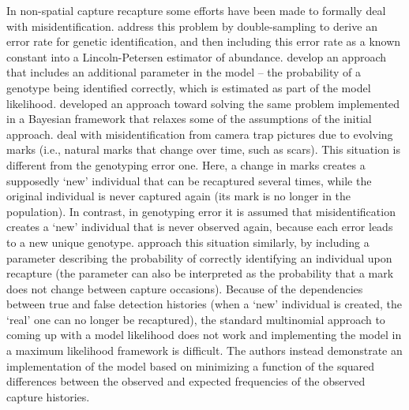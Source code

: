 In non-spatial capture recapture some efforts have been made to
formally deal with misidentification. \citet{stevick_etal:2001}
address this problem by double-sampling to derive an error rate for
genetic identification, and then including this error rate as a known
constant into a Lincoln-Petersen estimator of
abundance. \citet{lukacs_burnham:2005} develop an approach that
includes an additional parameter in the model -- the probability of a
genotype being identified correctly, which is estimated as part of the
model likelihood. \citet{link_etal:2010} developed an approach toward
solving the same problem implemented in a Bayesian framework that
relaxes some of the assumptions of the initial approach.
\citet{yoshizaki_etal:2009} deal with misidentification from camera
trap pictures due to evolving marks (i.e., natural marks that change
over time, such as scars). This situation is different from the
genotyping error one. Here, a change in marks creates a supposedly
`new' individual that can be recaptured several times, while the
original individual is never captured again (its mark is no longer in
the population). In contrast, in genotyping error it is assumed that
misidentification creates a `new' individual that is never observed
again, because each error leads to a new unique
genotype. \citet{yoshizaki_etal:2009} approach this situation
similarly, by including a parameter describing the probability of
correctly identifying an individual upon recapture (the parameter can
also be interpreted as the probability that a mark does not change
between capture occasions). Because of the dependencies between true
and false detection histories (when a `new' individual is created, the
`real' one can no longer be recaptured), the standard multinomial
approach to coming up with a model likelihood does not work and
implementing the model in a maximum likelihood framework is
difficult. The authors instead demonstrate an implementation of the
model based on minimizing a function of the squared differences
between the observed and expected frequencies of the observed capture
histories.

